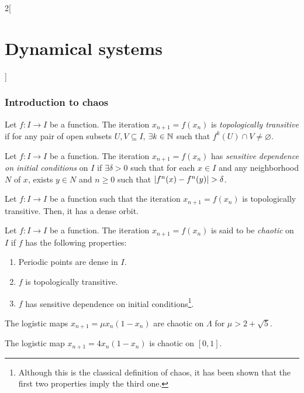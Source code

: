 \documentclass[../../../main_math.tex]{subfiles}
\begin{document}
\begin{multicols}{2}[\section{Dynamical systems}]
  \subsubsection{Introduction to chaos}
  \begin{definition}
    Let $f : I\rightarrow I$ be a function. The iteration $x_{n+1}=f(x_n)$ is \emph{topologically transitive} if for any pair of open subsets $U,V\subseteq I$, $\exists k\in\mathbb{N}$ such that $f^k(U)\cap V\ne\varnothing$.
  \end{definition}
  \begin{definition}
    Let $f : I\rightarrow I$ be a function. The iteration $x_{n+1}=f(x_n)$ has \emph{sensitive dependence on initial conditions} on $I$ if $\exists\delta >0$ such that for each $x\in I$ and any neighborhood $N$ of $x$, exists $y \in N$ and $n \geq  0$ such that $\abs{f^n(x)-f^n(y)} > \delta$.
  \end{definition}
  \begin{lemma}
    Let $f : I\rightarrow I$ be a function such that the iteration $x_{n+1}=f(x_n)$ is topologically transitive. Then, it has a dense orbit.
  \end{lemma}
  \begin{definition}[Chaos]
    Let $f : I\rightarrow I$ be a function. The iteration $x_{n+1}=f(x_n)$ is said to be \emph{chaotic} on $I$ if $f$ has the following properties:
    \begin{enumerate}
      \item Periodic points are dense in $I$.
      \item $f$ is topologically transitive.
      \item $f$ has sensitive dependence on initial conditions\footnote{Although this is the classical definition of chaos, it has been shown that the first two properties imply the third one.}.
    \end{enumerate}
  \end{definition}
  \begin{theorem}
    The logistic maps $x_{n+1}=\mu x_n(1-x_n)$ are chaotic on $\Lambda$ for $\mu>2+\sqrt{5}$.
  \end{theorem}
  \begin{theorem}
    The logistic map $x_{n+1}=4x_n(1-x_n)$ is chaotic on $[0,1]$.
  \end{theorem}
\end{multicols}
\end{document}

